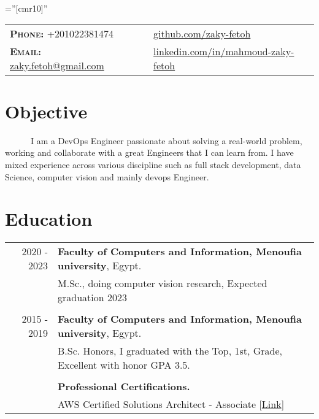 \documentclass[a4paper,10pt]{article}
\begin{document}
\pagestyle{fancy}
\fancyhead{} 
\renewcommand{\headrulewidth}{0pt}

\font\fb=''[cmr10]'' 
\par{\bigskip\par} %


\begin{tabular}{lp{4cm}l}
\textbf{\textsc{Phone:}} +201022381474 && \href{https://github.com/zaky-fetoh}{github.com/zaky-fetoh} \\
\textbf{\textsc{Email:}}   \href{mailto:zaky.fetoh@gmail.com}{zaky.fetoh@gmail.com} &&\href{https://www.linkedin.com/in/mahmoud-zaky-fetoh/}{linkedin.com/in/mahmoud-zaky-fetoh}\\

\end{tabular}

\section{\textbf{Objective}}
~~~~~~I am a DevOps Engineer passionate about solving a real-world problem, working and collaborate with a great Engineers that I can learn from. I have mixed experience across various discipline such as full stack development, data Science, computer vision and mainly devops Engineer. 

\section{\textbf{Education}}
\begin{tabular}{r|l}
    2020 - 2023  & \textbf{Faculty of Computers and Information, Menoufia university}, Egypt.\\ & M.Sc., doing computer vision research, Expected graduation  2023 \\
    &\\
    2015 - 2019 & \textbf{Faculty of Computers and Information, Menoufia university}, Egypt. \\ & B.Sc. Honors, I graduated with the Top, 1st, Grade, Excellent with honor GPA 3.5. \\
    &\\
    & \textbf{Professional Certifications.} \\
    & AWS Certified Solutions Architect - Associate [\href{https://cp.certmetrics.com/amazon/en/public/verify/credential/8ff7ef944a1c49cf873b541903d9cbc3}{Link}] \\
    \end{tabular}
\end{document}
